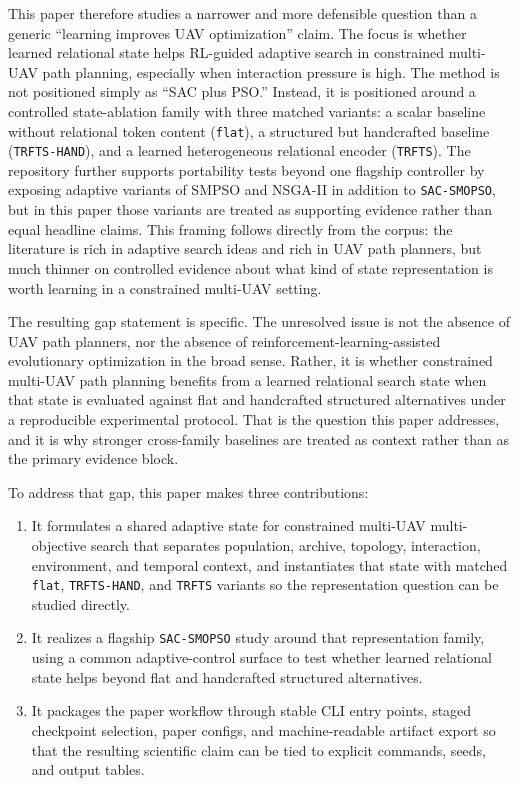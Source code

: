 \documentclass[a4paper,fleqn]{cas-dc}
\begin{document}
This paper therefore studies a narrower and more defensible question than a generic ``learning improves UAV optimization'' claim. The focus is whether learned relational state helps RL-guided adaptive search in constrained multi-UAV path planning, especially when interaction pressure is high. The method is not positioned simply as ``SAC plus PSO.'' Instead, it is positioned around a controlled state-ablation family with three matched variants: a scalar baseline without relational token content (\texttt{flat}), a structured but handcrafted baseline (\texttt{TRFTS-HAND}), and a learned heterogeneous relational encoder (\texttt{TRFTS}). The repository further supports portability tests beyond one flagship controller by exposing adaptive variants of SMPSO and NSGA-II in addition to \texttt{SAC-SMOPSO}, but in this paper those variants are treated as supporting evidence rather than equal headline claims. This framing follows directly from the corpus: the literature is rich in adaptive search ideas and rich in UAV path planners, but much thinner on controlled evidence about what kind of state representation is worth learning in a constrained multi-UAV setting.

The resulting gap statement is specific. The unresolved issue is not the absence of UAV path planners, nor the absence of reinforcement-learning-assisted evolutionary optimization in the broad sense. Rather, it is whether constrained multi-UAV path planning benefits from a learned relational search state when that state is evaluated against flat and handcrafted structured alternatives under a reproducible experimental protocol. That is the question this paper addresses, and it is why stronger cross-family baselines are treated as context rather than as the primary evidence block.

To address that gap, this paper makes three contributions:
\begin{enumerate}
\item It formulates a shared adaptive state for constrained multi-UAV multi-objective search that separates population, archive, topology, interaction, environment, and temporal context, and instantiates that state with matched \texttt{flat}, \texttt{TRFTS-HAND}, and \texttt{TRFTS} variants so the representation question can be studied directly.
\item It realizes a flagship \texttt{SAC-SMOPSO} study around that representation family, using a common adaptive-control surface to test whether learned relational state helps beyond flat and handcrafted structured alternatives.
\item It packages the paper workflow through stable CLI entry points, staged checkpoint selection, paper configs, and machine-readable artifact export so that the resulting scientific claim can be tied to explicit commands, seeds, and output tables.
\end{enumerate}
\end{document}
